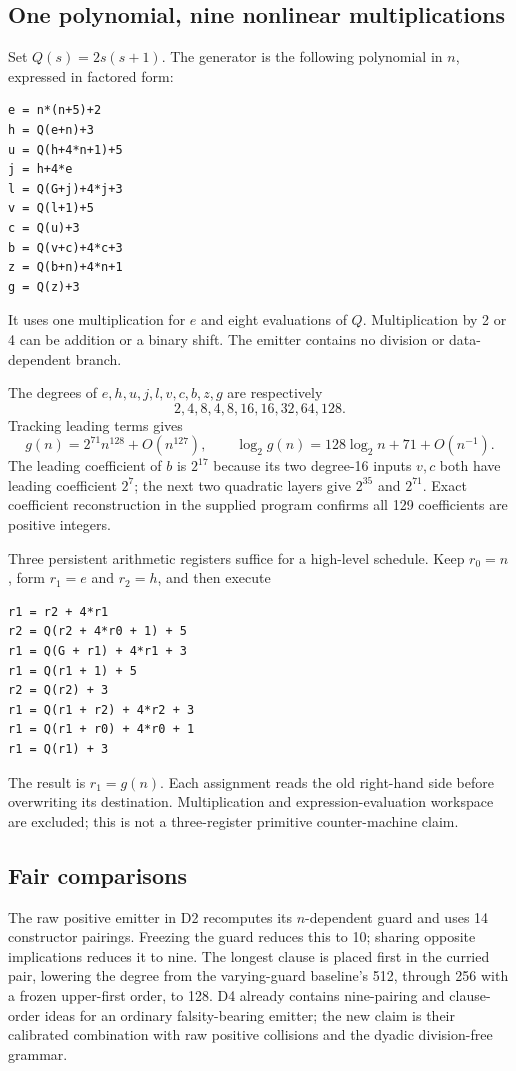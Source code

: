 \subsection{One polynomial, nine nonlinear multiplications}

Set $Q(s)=2s(s+1)$. The generator is the following polynomial in $n$, expressed in factored form:
\begin{lstlisting}
e = n*(n+5)+2
h = Q(e+n)+3
u = Q(h+4*n+1)+5
j = h+4*e
l = Q(G+j)+4*j+3
v = Q(l+1)+5
c = Q(u)+3
b = Q(v+c)+4*c+3
z = Q(b+n)+4*n+1
g = Q(z)+3
\end{lstlisting}
It uses one multiplication for $e$ and eight evaluations of $Q$. Multiplication by 2 or 4 can be addition or a binary shift. The emitter contains no division or data-dependent branch.

The degrees of $e,h,u,j,l,v,c,b,z,g$ are respectively
\[
                 2,4,8,4,8,16,16,32,64,128.
\]
Tracking leading terms gives
\[
        g(n)=2^{71}n^{128}+O(n^{127}),\qquad
        \log_2g(n)=128\log_2n+71+O(n^{-1}).
\]
The leading coefficient of $b$ is $2^{17}$ because its two degree-16 inputs $v,c$ both have leading coefficient $2^7$; the next two quadratic layers give $2^{35}$ and $2^{71}$. Exact coefficient reconstruction in the supplied program confirms all 129 coefficients are positive integers.

Three persistent arithmetic registers suffice for a high-level schedule. Keep $r_0=n$, form $r_1=e$ and $r_2=h$, and then execute
\begin{lstlisting}
r1 = r2 + 4*r1
r2 = Q(r2 + 4*r0 + 1) + 5
r1 = Q(G + r1) + 4*r1 + 3
r1 = Q(r1 + 1) + 5
r2 = Q(r2) + 3
r1 = Q(r1 + r2) + 4*r2 + 3
r1 = Q(r1 + r0) + 4*r0 + 1
r1 = Q(r1) + 3
\end{lstlisting}
The result is $r_1=g(n)$. Each assignment reads the old right-hand side before overwriting its destination. Multiplication and expression-evaluation workspace are excluded; this is not a three-register primitive counter-machine claim.

\subsection{Fair comparisons}

The raw positive emitter in D2 recomputes its $n$-dependent guard and uses 14 constructor pairings. Freezing the guard reduces this to 10; sharing opposite implications reduces it to nine. The longest clause is placed first in the curried pair, lowering the degree from the varying-guard baseline's 512, through 256 with a frozen upper-first order, to 128. D4 already contains nine-pairing and clause-order ideas for an ordinary falsity-bearing emitter; the new claim is their calibrated combination with raw positive collisions and the dyadic division-free grammar.

